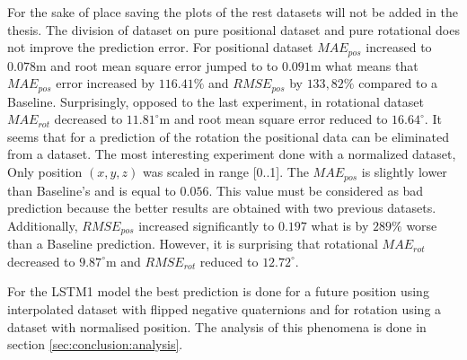 For the sake of place saving the plots of the rest datasets will not be added in the thesis. The division of dataset on pure positional dataset and pure rotational does not improve the prediction error. For positional dataset $MAE_{pos}$ increased to $0.078$m and root mean square error jumped to to $0.091$m what means that $MAE_{pos}$ error increased by $116.41\%$ and $RMSE_{pos}$ by $133,82\%$ compared to a Baseline. Surprisingly, opposed to the last experiment, in rotational dataset $MAE_{rot}$ decreased to $11.81^{\circ}$m and root mean square error reduced to $16.64^{\circ}$. It seems that for a prediction of the rotation the positional data can be eliminated from a dataset. The most interesting experiment done with a normalized dataset, Only position $(x, y, z)$ was scaled in range [0..1]. The $MAE_{pos}$ is slightly lower than Baseline's and is equal to $0.056$. This value must be considered as bad prediction because the better results are obtained with two previous datasets. Additionally, $RMSE_{pos}$ increased significantly to $0.197$ what is by $289\%$ worse than a Baseline prediction. However, it is surprising that rotational $MAE_{rot}$ decreased to $9.87^{\circ}$m and $RMSE_{rot}$ reduced to $12.72^{\circ}$. 

For the LSTM1 model the best prediction is done for a future position using interpolated dataset with flipped negative quaternions and for rotation using a dataset with normalised position. The analysis of this phenomena is done in section \ref{sec:conclusion:analysis}.

